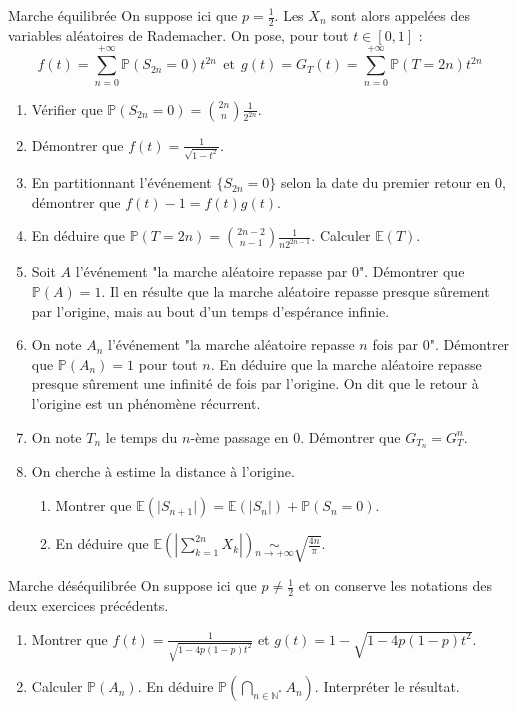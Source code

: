 \documentclass[french,a4paper]{article}
\renewcommand{\P}{\mathbb{P}}
\newcommand{\N}{\mathbb{N}}
\newcommand{\st}{^*}
\newcommand{\E}{\mathbb{E}}
\theoremstyle{plain}
\theoremstyle{definition}
\theoremstyle{remark}
\begin{document}
\begin{ex}[Châteaux]{Marche équilibrée}
	On suppose ici que $p=\displaystyle\frac{1}{2}$. Les $X_n$ sont alors appelées des variables aléatoires de Rademacher. On pose, pour tout $t\in[0,1]$ : $$f(t)=\sum_{n=0}^{+\infty}\P(S_{2n}=0)t^{2n}\ \ \text{et}\ \ g(t)=G_T(t)=\sum_{n=0}^{+\infty}\P(T=2n)t^{2n}$$
	\begin{enumerate}
		\item Vérifier que $\P(S_{2n}=0)=\displaystyle\binom{2n}{n}\frac{1}{2^{2n}}$.
		\item Démontrer que $f(t)=\displaystyle\frac{1}{\sqrt{1-t^2}}$.
		\item En partitionnant l'événement $\{S_{2n}=0\}$ selon la date du premier retour en $0$, démontrer que $f(t)-1=f(t)g(t)$.
		\item En déduire que $\P(T=2n)=\displaystyle\binom{2n-2}{n-1}\frac{1}{n2^{2n-1}}$. Calculer $\E(T)$.
		\item Soit $A$ l'événement "la marche aléatoire repasse par $0$". Démontrer que $\P(A)=1$. Il en résulte que la marche aléatoire repasse presque sûrement par l'origine, mais au bout d'un temps d'espérance infinie.
		\item On note $A_n$ l'événement "la marche aléatoire repasse $n$ fois par $0$". Démontrer que $\P(A_n)=1$ pour tout $n$. En déduire que la marche aléatoire repasse presque sûrement une infinité de fois par l'origine. On dit que le retour à l'origine est un phénomène récurrent.
		\item On note $T_n$ le temps du $n$-ème passage en $0$. Démontrer que $G_{T_n}=G_T^n$.
		\item On cherche à estime la distance à l'origine.
		\begin{enumerate}[label=\alph*.]
			\item Montrer que $\E(\lvert S_{n+1}\rvert)=\E(\lvert S_n\rvert)+\P(S_n=0)$.
			\item En déduire que $\displaystyle\E\left(\left\lvert\sum_{k=1}^{2n}X_k\right\rvert\right)\underset{n\to+\infty}{\sim}\sqrt{\frac{4n}{\pi}}$.
		\end{enumerate}
	\end{enumerate}
\end{ex}
\begin{ex}[Châteaux]{Marche déséquilibrée}
	On suppose ici que $p\ne\displaystyle\frac{1}{2}$ et on conserve les notations des deux exercices précédents.
	\begin{enumerate}
		\item Montrer que $f(t)=\displaystyle\frac{1}{\sqrt{1-4p(1-p)t^2}}$ et $g(t)=1-\sqrt{1-4p(1-p)t^2}$.
		\item Calculer $\P(A_n)$. En déduire $\P\left(\bigcap_{n\in\N\st}A_n\right)$. Interpréter le résultat.
	\end{enumerate}
\end{ex}
\end{document}
